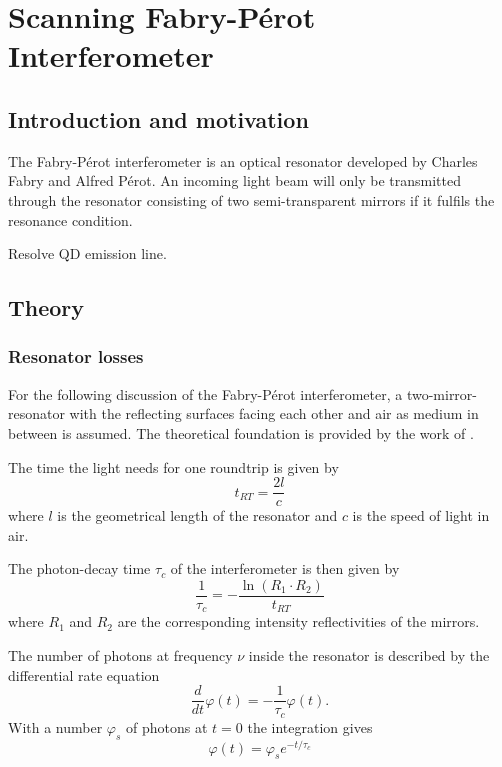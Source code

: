 \chapter{Scanning Fabry-Pérot Interferometer}
\label{chapter:scanning-fabry-perot}
\section{Introduction and motivation}


The Fabry-Pérot interferometer is an optical resonator developed by Charles Fabry and Alfred Pérot.
An incoming light beam will only be transmitted through the resonator consisting of two semi-transparent mirrors if it fulfils the resonance condition.\cite{kaldewey_coherent_2017}

Resolve QD emission line.



\section{Theory}


\subsection{Resonator losses}
For the following discussion of the Fabry-Pérot interferometer, a two-mirror-resonator with the reflecting surfaces facing each other and air as medium in between is assumed.
The theoretical foundation is provided by the work of \textcite{ismail_fabry-perot_2016}.

The time the light needs for one roundtrip is given by
\begin{equation}
t_{RT} = \frac{2l}{c}
\end{equation}
where $l$ is the geometrical length of the resonator and $c$ is the speed of light in air. 

The photon-decay time $\tau_c$ of the interferometer is then given by
\begin{equation}
\frac{1}{\tau_c} = - \frac{\ln(R_1 \cdot R_2)}{t_{RT}}
\end{equation}
where $R_1$ and $R_2$ are the corresponding intensity reflectivities of the mirrors.

The number of photons at frequency $\nu$ inside the resonator is described by the differential rate equation
\begin{equation}
\frac{d}{dt} \varphi(t) = - \frac{1}{\tau_c}\varphi(t).
\end{equation}
With a number $\varphi_s$ of photons at $t=0$ the integration gives
\begin{equation}
\label{eq:photon-decay}
\varphi(t)=\varphi_s e^{-t/\tau_c}
\end{equation}

